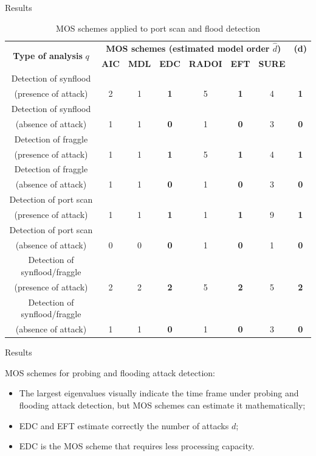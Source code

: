 \documentclass[newPxFont, numfooter, sectionpages]{beamer}
\begin{document}
\begin{frame}{Results}
	
	\begin{table}[h!]
	  \centering
	  \tiny
	  \caption{MOS schemes applied to port scan and flood detection}
	  \label{tab:tab4}
	  \begin{tabular}{ c c c c c c c c }
		\toprule
		\multirow{2}{*}{\textbf{Type of analysis} $q$} &\multicolumn{6}{c}{\textbf{MOS schemes (estimated model order $\hat{d}$)}} &{\textbf{(d)}}\\ 
				\hhline{~------~}
			&\textbf{AIC} &\textbf{MDL} &\textbf{EDC} &\textbf{RADOI} &\textbf{EFT} &\textbf{SURE}\\
		\midrule
		Detection of synflood \\(presence of attack) &2 &1 &\textbf{1} &5 &\textbf{1} &4 &\textbf{1} \\
		Detection of synflood \\(absence of attack) &1 &1 &\textbf{0} &1 &\textbf{0} &3 &\textbf{0} \\
		\midrule
		Detection of fraggle \\(presence of attack) &1 &1 &\textbf{1} &5 &\textbf{1} &4 &\textbf{1} \\
		Detection of fraggle \\(absence of attack) &1 &1 &\textbf{0} &1 &\textbf{0} &3 &\textbf{0} \\
		\midrule
		Detection of port scan \\(presence of attack) &1 &1 &\textbf{1} &1 &\textbf{1} &9 &\textbf{1} \\
		Detection of port scan \\(absence of attack) &0 &0 &\textbf{0} &1 &\textbf{0} &1 &\textbf{0} \\
		\midrule
		Detection of synflood/fraggle \\(presence of attack) &2 &2 &\textbf{2} &5 &\textbf{2} &5 &\textbf{2} \\
		Detection of synflood/fraggle \\(absence of attack) &1 &1 &\textbf{0} &1 &\textbf{0} &3 &\textbf{0} \\
	    \bottomrule
	  \end{tabular}
	\end{table}

\end{frame}
\begin{frame}{Results}
	
	MOS schemes for probing and flooding attack detection:
	\begin{itemize}
		\item The largest eigenvalues visually indicate the time frame under probing and flooding attack detection, but MOS schemes can estimate it mathematically;
		\item EDC and EFT estimate correctly the number of attacks $d$;
		\item EDC is the MOS scheme that requires less processing capacity.
	\end{itemize}

\end{frame}
\end{document}
